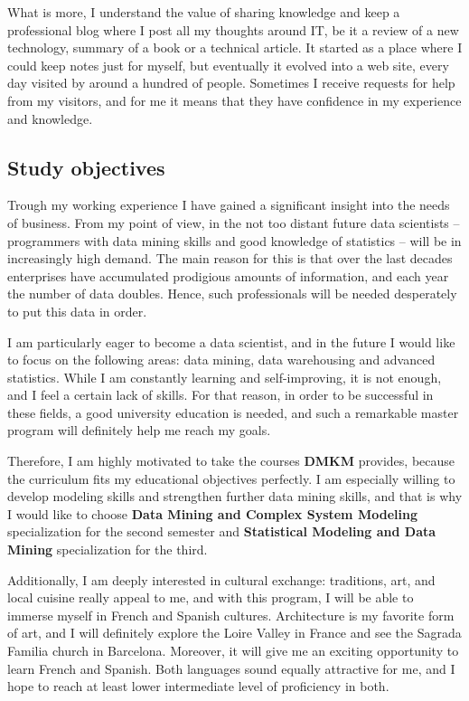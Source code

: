 \documentclass[a4paper,12pt]{article}
\begin{document}
What is more, I understand the value of sharing knowledge and keep a professional blog where I post all my thoughts around IT, be it a review of a new technology, summary of a book or a technical article. It started as a place where I could keep notes just for myself, but eventually it evolved into a web site, every day visited by around a hundred of people. Sometimes I receive requests for help from my visitors, and for me it means that they have confidence in my experience and knowledge.

\subsection*{Study objectives}

Trough my working experience I have gained a significant insight into the needs of business. From my point of view, in the not too distant future data scientists -- programmers with data mining skills and good knowledge of statistics -- will be in increasingly high demand. The main reason for this is that over the last decades enterprises have accumulated prodigious amounts of information, and each year the number of data doubles. Hence, such professionals will be needed desperately to put this data in order.

I am particularly eager to become a data scientist, and in the future I would like to focus on the following areas: data mining, data warehousing and advanced statistics. While I am constantly learning and self-improving, it is not enough, and I feel a certain lack of skills. For that reason, in order to be successful in these fields, a good university education is needed, and such a remarkable master program will definitely help me reach my goals.

Therefore, I am highly motivated to take the courses \textbf{DMKM} provides, because the curriculum fits my educational objectives perfectly. I am especially willing to develop modeling skills and strengthen further data mining skills, and that is why I would like to choose \textbf{Data Mining and Complex System Modeling} specialization for the second semester and \textbf{Statistical Modeling and Data Mining} specialization for the third.

Additionally, I am deeply interested in cultural exchange: traditions, art, and local cuisine really appeal to me, and with this program, I will be able to immerse myself in French and Spanish cultures. Architecture is my favorite form of art, and I will definitely explore the Loire Valley in France and see the Sagrada Familia church in Barcelona. Moreover, it will give me an exciting opportunity to learn French and Spanish. Both languages sound equally attractive for me, and I hope to reach at least lower intermediate level of proficiency in both.
\end{document}
